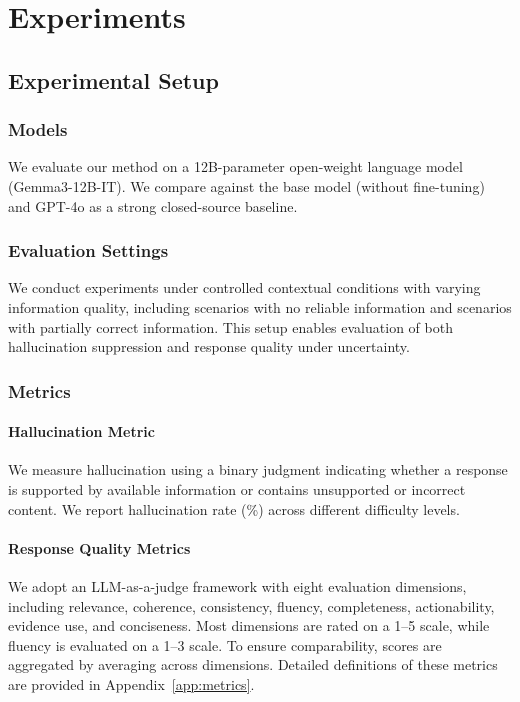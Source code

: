 \section{Experiments}

\subsection{Experimental Setup}

\subsubsection{Models}

We evaluate our method on a 12B-parameter open-weight language model (Gemma3-12B-IT). 
We compare against the base model (without fine-tuning) and GPT-4o as a strong closed-source baseline.

\subsubsection{Evaluation Settings}

We conduct experiments under controlled contextual conditions with varying information quality, including scenarios with no reliable information and scenarios with partially correct information. 
This setup enables evaluation of both hallucination suppression and response quality under uncertainty.

\subsubsection{Metrics}

\paragraph{Hallucination Metric}
We measure hallucination using a binary judgment indicating whether a response is supported by available information or contains unsupported or incorrect content. 
We report hallucination rate (\%) across different difficulty levels.

\paragraph{Response Quality Metrics}
We adopt an LLM-as-a-judge framework with eight evaluation dimensions, including relevance, coherence, consistency, fluency, completeness, actionability, evidence use, and conciseness. 
Most dimensions are rated on a 1--5 scale, while fluency is evaluated on a 1--3 scale. 
To ensure comparability, scores are aggregated by averaging across dimensions. 
Detailed definitions of these metrics are provided in Appendix~\ref{app:metrics}.


